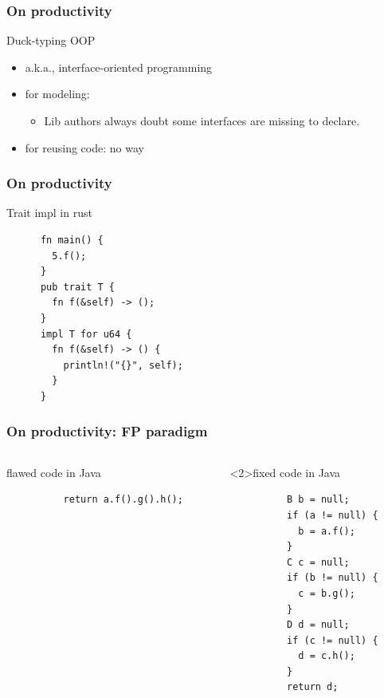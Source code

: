 \documentclass[lualatex,utf8]{beamer}
\begin{document}
\begin{frame}
  \frametitle{On productivity}
  \begin{block}{Duck-typing OOP}
    \begin{itemize}
    \item a.k.a., interface-oriented programming
    \item for modeling:
      \begin{itemize}
      \item Lib authors always doubt some interfaces are missing to declare.
      \end{itemize}
    \item for reusing code: no way
    \end{itemize}
  \end{block}
\end{frame}

\begin{frame}[fragile]
  \frametitle{On productivity}
  \begin{block}{Trait impl in rust}
    \begin{verbatim}
      fn main() {
        5.f();
      }
      pub trait T {
        fn f(&self) -> ();
      }
      impl T for u64 {
        fn f(&self) -> () {
          println!("{}", self);
        }
      }
    \end{verbatim}
  \end{block}
\end{frame}

\begin{frame}[fragile]
  \frametitle{On productivity: FP paradigm}
  \begin{columns}[t]
    \begin{column}{.45\textwidth}
      \begin{block}{flawed code in Java}
        \begin{verbatim}
          return a.f().g().h();
        \end{verbatim}
      \end{block}
    \end{column}
    \begin{column}{.45\textwidth}
      \begin{block}<2>{fixed code in Java}
        \begin{verbatim}
          B b = null;
          if (a != null) {
            b = a.f();
          }
          C c = null;
          if (b != null) {
            c = b.g();
          }
          D d = null;
          if (c != null) {
            d = c.h();
          }
          return d;
        \end{verbatim}
      \end{block}
    \end{column}
  \end{columns}
\end{frame}
\end{document}
